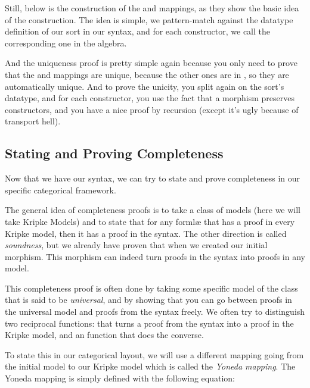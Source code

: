 \documentclass[10pt,a4paper]{article}
\begin{document}
			Still, below is the construction of the  and  mappings, as they show the basic idea of the construction. The idea is simple, we pattern-match against the datatype definition of our sort in our syntax, and for each constructor, we call the corresponding one in the algebra.
			
			And the uniqueness proof is pretty simple again because you only need to prove that the  and  mappings are unique, because the other ones are in , so they are automatically unique. And to prove the unicity, you split again on the sort's datatype, and for each constructor, you use the fact that a morphism preserves constructors, and you have a nice proof by recursion (except it's ugly because of transport hell).
			
			\begin{tcolorbox}
			\end{tcolorbox}
				
		\subsection{Stating and Proving Completeness}
		
			Now that we have our syntax, we can try to state and prove completeness in our specific categorical framework.
			
			The general idea of completeness proofs is to take a class of models (here we will take Kripke Models) and to state that for any formlæ that has a proof in every Kripke model, then it has a proof in the syntax. The other direction is called \emph{soundness}, but we already have proven that when we created our initial morphism. This morphism can indeed turn proofs in the syntax into proofs in any model.
			
			This completeness proof is often done by taking some specific model of the class that is said to be \emph{universal}, and by showing that you can go between proofs in the universal model and proofs from the syntax freely. We often try to distinguish two reciprocal functions:  that turns a proof from the syntax into a proof in the Kripke model, and an  function that does the converse.
			
			To state this in our categorical layout, we will use a different mapping going from the initial model to our Kripke model which is called the \emph{Yoneda mapping}. The Yoneda mapping is simply defined with the following equation:
			
\end{document}
